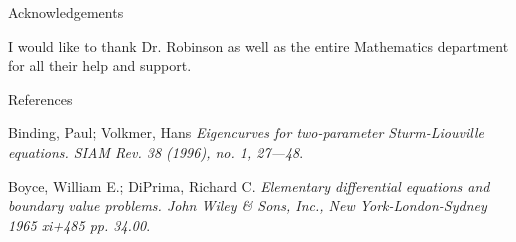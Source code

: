 \documentclass{beamer}
\begin{document}
\begin{frame}{Acknowledgements}

\vspace*{-40mm}

I would like to thank Dr. Robinson as well as the entire Mathematics department for all their help and support.

\end{frame}

\begin{frame}{References}

\vspace*{-20mm}

\begin{center}

\begin{thebibliography}{9}

Binding, Paul; Volkmer, Hans
\textit{Eigencurves for two-parameter Sturm-Liouville equations. SIAM Rev. 38 (1996), no. 1, 27---48}.

\vspace{1mm}

Boyce, William E.; DiPrima, Richard C.
\textit{Elementary differential equations and boundary value problems. John Wiley \& Sons, Inc., New York-London-Sydney 1965 xi+485 pp. 34.00}. 

\end{thebibliography}

\end{center}

\end{frame}
\end{document}
